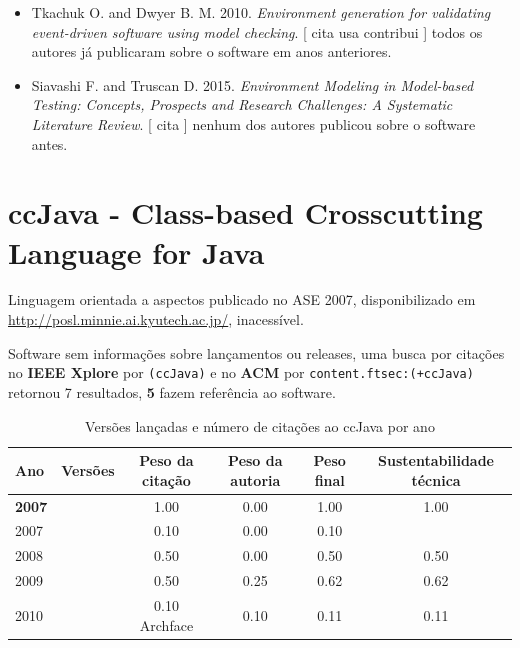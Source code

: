 \begin{itemize}
      [
          cita
      ]
todos os autores já publicaram sobre o software em anos anteriores.
\item Tkachuk O. and Dwyer B. M.
      2010.
        \textit{ Environment generation for validating event-driven software using model checking}.
      [
          cita
          usa
          contribui
      ]
todos os autores já publicaram sobre o software em anos anteriores.
\item Siavashi F. and Truscan D.
      2015.
        \textit{ Environment Modeling in Model-based Testing: Concepts, Prospects and Research Challenges: A Systematic Literature Review}.
      [
          cita
      ]
nenhum dos autores publicou sobre o software antes.
\end{itemize}
\section{ccJava - Class-based Crosscutting Language for Java}

Linguagem orientada a aspectos
publicado no ASE 2007,
disponibilizado em \url{http://posl.minnie.ai.kyutech.ac.jp/},
inacessível.

Software sem informações sobre lançamentos ou releases,
uma busca por citações no {\bf IEEE Xplore} por
\texttt{(ccJava)}
e no {\bf ACM} por
\texttt{content.ftsec:(+ccJava)}
retornou
7 resultados,
{\bf 5} fazem referência ao software.


\begin{table}[H]
\caption{Versões lançadas e número de citações ao ccJava por ano}
\centering
\begin{tabular}{| l | c | c | c | c | c |}
  \hline
  Ano & Versões & Peso da citação & Peso da autoria & Peso final & Sustentabilidade técnica \\
  \hline
            {\bf 2007}
          &
          
          &
          1.00
          &
          0.00
          &
          1.00
          &
            {\color{blue} 1.00}
          \\
            2007
          &
          
          &
          0.10
          &
          0.00
          &
          0.10
          &
          \\
\hline
            2008
          &
          
          &
          0.50
          &
          0.00
          &
          0.50
          &
            {\color{blue} 0.50}
          \\
\hline
            2009
          &
          
          &
          0.50
          &
          0.25
          &
          0.62
          &
            {\color{blue} 0.62}
          \\
\hline
            2010
          &
          
          &
          0.10
            {\tiny Archface}
          &
          0.10
          &
          0.11
          &
            {\color{red} 0.11}
          \\
\hline
\end{tabular}
\end{table}

